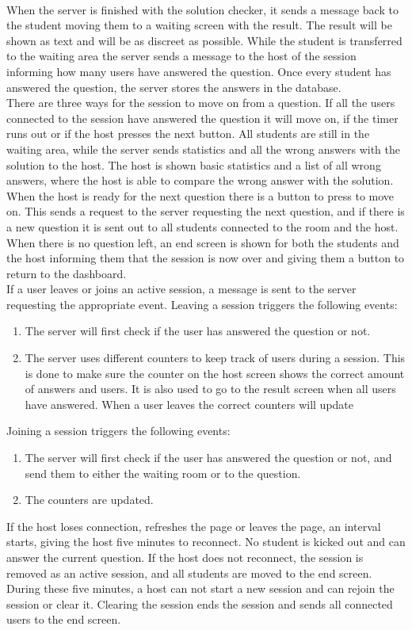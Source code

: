 \\[11pt]
When the server is finished with the solution checker, it sends a message back to the student moving them to a waiting screen with the result. The result will be shown as text and will be as discreet as possible. While the student is transferred to the waiting area the server sends a message to the host of the session informing how many users have answered the question. Once every student has answered the question, the server stores the answers in the database.
\\[11pt]
There are three ways for the session to move on from a question. If all the users connected to the session have answered the question it will move on, if the timer runs out or if the host presses the next button. All students are still in the waiting area, while the server sends statistics and all the wrong answers with the solution to the host. The host is shown basic statistics and a list of all wrong answers, where the host is able to compare the wrong answer with the solution. When the host is ready for the next question there is a button to press to move on. This sends a request to the server requesting the next question, and if there is a new question it is sent out to all students connected to the room and the host. When there is no question left, an end screen is shown for both the students and the host informing them that the session is now over and giving them a button to return to the dashboard.
\\[11pt]
If a user leaves or joins an active session, a message is sent to the server requesting the appropriate event. Leaving a session triggers the following events:
\begin{enumerate}
    \item The server will first check if the user has answered the question or not. 
    \item The server uses different counters to keep track of users during a session. This is done to make sure the counter on the host screen shows the correct amount of answers and users. It is also used to go to the result screen when all users have answered. When a user leaves the correct counters will update
\end{enumerate}
Joining a session triggers the following events:
\begin{enumerate}
    \item The server will first check if the user has answered the question or not, and send them to either the waiting room or to the question.
    \item The counters are updated.
\end{enumerate}
If the host loses connection, refreshes the page or leaves the page, an interval starts, giving the host five minutes to reconnect. No student is kicked out and can answer the current question. If the host does not reconnect, the session is removed as an active session, and all students are moved to the end screen. During these five minutes, a host can not start a new session and can rejoin the session or clear it. Clearing the session ends the session and sends all connected users to the end screen.